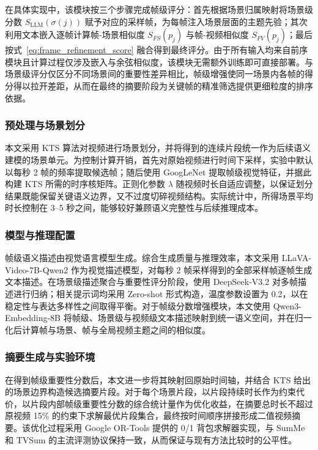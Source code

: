在具体实现中，该模块按三个步骤完成帧级评分：首先根据场景归属映射将场景级分数 $S_{\mathrm{LLM}}(\sigma(j))$ 赋予对应的采样帧，为每帧注入场景层面的主题先验；其次利用文本嵌入逐帧计算帧-场景相似度 $S_{FS}(p_j)$ 与帧-视频相似度 $S_{FV}(p_j)$；最后按式~\eqref{eq:frame_refinement_score} 融合得到最终评分。由于所有输入均来自前序模块且计算过程仅涉及嵌入与余弦相似度，该模块无需额外训练即可直接部署。与场景级评分仅区分不同场景间的重要性差异相比，帧级增强使同一场景内各帧的得分得以拉开差距，从而在最终的摘要阶段为关键帧的精准筛选提供更细粒度的排序依据。

\subsubsection{预处理与场景划分}
本文采用 KTS 算法对视频进行场景划分，并将得到的连续片段统一作为后续语义建模的场景单元。为控制计算开销，首先对原始视频进行时间下采样，实验中默认以每秒 2 帧的频率提取候选帧；随后使用 GoogLeNet 提取帧级视觉特征，并据此构建 KTS 所需的时序核矩阵。正则化参数 $\lambda$ 随视频时长自适应调整，以保证划分结果既能保留关键语义边界，又不过度切碎视频结构。实际统计中，所得场景平均时长控制在 3--5 秒之间，能够较好兼顾语义完整性与后续推理成本。

\subsubsection{模型与推理配置}
帧级语义描述由视觉语言模型生成。综合生成质量与推理效率，本文采用 LLaVA-Video-7B-Qwen2 作为视觉描述模型，对每秒 2 帧采样得到的全部采样帧逐帧生成文本描述。在场景级描述聚合与重要性评分阶段，使用 DeepSeek-V3.2 对多帧描述进行归纳；相关提示词均采用 Zero-shot 形式构造，温度参数设置为 0.2，以在稳定性与表达多样性之间取得平衡。对于帧级分数增强模块，本文使用 Qwen3-Embedding-8B 将帧级、场景级与视频级文本描述映射到统一语义空间，并在归一化后计算帧与场景、帧与全局视频主题之间的相似度。

\subsubsection{摘要生成与实验环境}
在得到帧级重要性分数后，本文进一步将其映射回原始时间轴，并结合 KTS 给出的场景边界构造候选摘要片段。对于每个场景片段，以片段持续时长作为约束代价，以片段内部帧级重要性分数的综合统计量作为优化收益，在摘要总时长不超过原视频 15\% 的约束下求解最优片段集合，最终按时间顺序拼接形成二值视频摘要。该优化过程采用 Google OR-Tools 提供的 0/1 背包求解器实现，与 SumMe 和 TVSum 的主流评测协议保持一致，从而保证与现有方法比较时的公平性。

